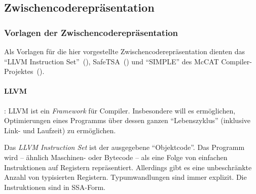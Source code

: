\documentclass[twoside,a4paper,fleqn,12pt]{article}
\begin{document}

\subsection{Zwischencoderepräsentation}




\subsubsection{Vorlagen der Zwischencoderepräsentation}

Als Vorlagen für die hier vorgestellte Zwischencoderepräsentation dienten das ``LLVM Instruction Set''~(\cite{LLVM:CGO04}),
SafeTSA~(\cite{SafeTSA}) und ``SIMPLE'' des McCAT Compiler-Projektes~(\cite{SIMPLE}).


\paragraph{LLVM}: LLVM ist ein \emph{Framework} für Compiler. Insbesondere will es ermöglichen, Optimierungen
eines Programms über dessen ganzen "`Lebenszyklus"' (inklusive Link- und Laufzeit) zu ermöglichen.

Das \emph{LLVM Instruction Set} ist der ausgegebene "`Objektcode"'. Das Programm wird -- ähnlich Maschinen-
oder Bytecode -- als eine Folge von einfachen Instruktionen auf Registern repräsentiert. 
Allerdings gibt es eine unbeschränkte Anzahl von typisierten Registern. Typumwandlungen sind immer explizit.
Die Instruktionen sind in SSA-Form.

\end{document}

